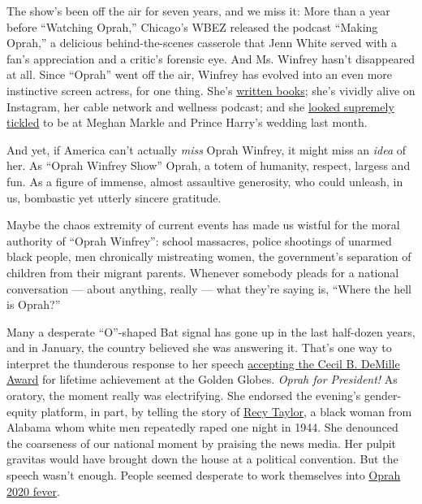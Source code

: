 The show's been off the air for seven years, and we miss it: More than a
year before ``Watching Oprah,'' Chicago's WBEZ released the podcast
``Making Oprah,'' a delicious behind-the-scenes casserole that Jenn
White served with a fan's appreciation and a critic's forensic eye. And
Ms. Winfrey hasn't disappeared at all. Since ``Oprah'' went off the air,
Winfrey has evolved into an even more instinctive screen actress, for
one thing. She's
\href{https://books.google.com/books/about/The_Wisdom_of_Sundays.html?id=0dw1DwAAQBAJ\&printsec=frontcover\&source=kp_read_button\#v=onepage\&q\&f=false}{written
books}; she's vividly alive on Instagram, her cable network and wellness
podcast; and she
\href{https://www.nytimes3xbfgragh.onion/slideshow/2018/05/19/style/the-royal-wedding/s/xxRoyal-Wedding-Arrive-slide-6NCY.html}{looked
supremely tickled} to be at Meghan Markle and Prince Harry's wedding
last month.

And yet, if America can't actually \emph{miss} Oprah Winfrey, it might
miss an \emph{idea} of her. As ``Oprah Winfrey Show'' Oprah, a totem of
humanity, respect, largess and fun. As a figure of immense, almost
assaultive generosity, who could unleash, in us, bombastic yet utterly
sincere gratitude.

Maybe the chaos extremity of current events has made us wistful for the
moral authority of ``Oprah Winfrey'': school massacres, police shootings
of unarmed black people, men chronically mistreating women, the
government's separation of children from their migrant parents. Whenever
somebody pleads for a national conversation --- about anything, really
--- what they're saying is, ``Where the hell is Oprah?''

Many a desperate ``O''-shaped Bat signal has gone up in the last
half-dozen years, and in January, the country believed she was answering
it. That's one way to interpret the thunderous response to her speech
\href{https://www.nytimes3xbfgragh.onion/2018/01/07/movies/oprah-winfrey-golden-globes-speech-transcript.html}{accepting
the Cecil B. DeMille Award} for lifetime achievement at the Golden
Globes. \emph{Oprah for President!} As oratory, the moment really was
electrifying. She endorsed the evening's gender-equity platform, in
part, by telling the story of
\href{https://www.nytimes3xbfgragh.onion/2017/12/29/obituaries/recy-taylor-alabama-rape-victim-dead.html}{Recy
Taylor}, a black woman from Alabama whom white men repeatedly raped one
night in 1944. She denounced the coarseness of our national moment by
praising the news media. Her pulpit gravitas would have brought down the
house at a political convention. But the speech wasn't enough. People
seemed desperate to work themselves into
\href{https://www.nytimes3xbfgragh.onion/2018/01/08/movies/oprah-winfrey-lifetime-achievement-golden-globes.html}{Oprah
2020 fever}.

